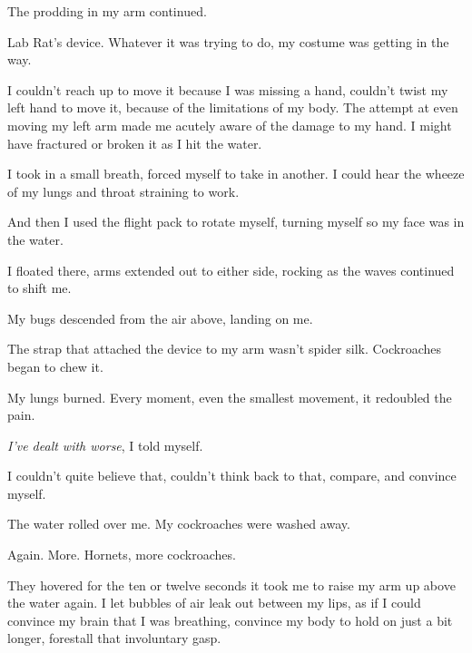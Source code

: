 The prodding in my arm continued.



Lab Rat's device.  Whatever it was trying to do, my costume was getting in the way.



I couldn't reach up to move it because I was missing a hand, couldn't twist my left hand to move it, because of the limitations of my body.  The attempt at even moving my left arm made me acutely aware of the damage to my hand.  I might have fractured or broken it as I hit the water.



I took in a small breath, forced myself to take in another.  I could hear the wheeze of my lungs and throat straining to work.



And then I used the flight pack to rotate myself, turning myself so my face was in the water.



I floated there, arms extended out to either side, rocking as the waves continued to shift me.



My bugs descended from the air above, landing on me.



The strap that attached the device to my arm wasn't spider silk.  Cockroaches began to chew it.



My lungs burned.  Every moment, even the smallest movement, it redoubled the pain.



\emph{I've dealt with worse}, I told myself.



I couldn't quite believe that, couldn't think back to that, compare, and convince myself.



The water rolled over me.  My cockroaches were washed away.



Again.  More.  Hornets, more cockroaches.



They hovered for the ten or twelve seconds it took me to raise my arm up above the water again.  I let bubbles of air leak out between my lips, as if I could convince my brain that I was breathing, convince my body to hold on just a bit longer, forestall that involuntary gasp.



